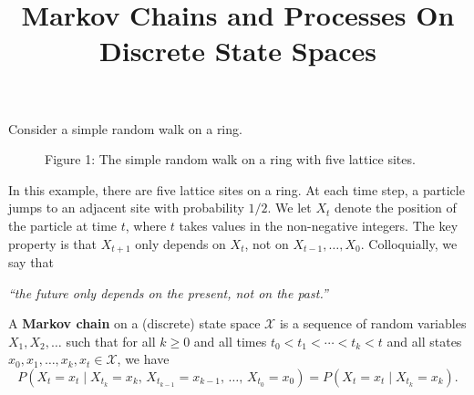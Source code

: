 \documentclass{ximera}
\title{Markov Chains and Processes On Discrete State Spaces}
\begin{document}
\begin{abstract}
\end{abstract}
\maketitle

Consider a simple random walk on a ring.
\vspace{1cm}

\begin{figure}[h]
\centering
{}
\caption{Figure 1: The simple random walk on a ring with five lattice sites.}
\label{markov-ring}
\end{figure}

In this example, there are five lattice sites on a ring. At each time step, a particle jumps to an adjacent
site with probability $1/2$. We let $X_t$ denote the position of the particle at time $t$, where $t$ takes
values in the non-negative integers. The key property is that $X_{t+1}$ only depends on $X_t$, not on
$X_{t-1}, \ldots, X_0$. Colloquially, we say that

\begin{center}
\textit{``the future only depends on the present, not on the past.''}
\end{center}

\begin{definition}
A \textbf{Markov chain} on a (discrete) state space $\mathcal{X}$ is a sequence of random variables
$X_1, X_2, \ldots$ such that for all $k \geq 0$ and all times $t_0 < t_1 < \cdots < t_k < t$ and all states
$x_0, x_1, \ldots, x_k, x_t \in \mathcal{X}$, we have
\[
P(X_t = x_t \mid X_{t_k} = x_k,\, X_{t_{k-1}} = x_{k-1},\, \ldots,\, X_{t_0} = x_0)
= P(X_t = x_t \mid X_{t_k} = x_k).
\]
\end{definition}
\end{document}

